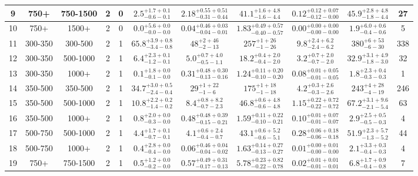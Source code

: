 \documentclass[11pt, oneside]{article}
\begin{document}
\begin{table}
{\begin{tabular}{ |c|c|c|c|c||c|c|c|c||c|c| }
9 & 750+ & 750-1500 & 2 & 0 & $2.5^{+1.7+0.1}_{-0.6-0.1}$ & $2.18^{+0.55+0.51}_{-0.31-0.44}$ & $41.1^{+1.6+4.8}_{-1.6-4.4}$ & $0.12^{+0.12+0.07}_{-0.12-0.00}$ & $45.9^{+2.8+4.8}_{-1.8-4.4}$ & 27 \\ \hline
10 & 750+ & 1500+ & 2 & 0 & $0.0^{+5.6+0.0}_{-0.0-0.0}$ & $0.04^{+0.46+0.03}_{-0.04-0.01}$ & $1.83^{+0.49+0.57}_{-0.40-0.57}$ & $0.00^{+0.00+0.00}_{-0.00-0.00}$ & $1.9^{+6.0+0.6}_{-0.4-0.6}$ & 5 \\ \hline
11 & 300-350 & 300-500 & 2 & 1 & $65.8^{+3.9+0.8}_{-3.4-0.8}$ & $48^{+ 2+46}_{- 2-13}$ & $257^{+ 1+26}_{- 1-26}$ & $9.8^{+2.4+6.2}_{-2.4-6.2}$ & $380^{+ 6+53}_{- 6-30}$ & 338 \\ \hline
12 & 300-350 & 500-1000 & 2 & 1 & $6.4^{+2.3+0.1}_{-1.2-0.1}$ & $5.0^{+0.7+4.0}_{-0.5-1.1}$ & $18.2^{+0.4+2.0}_{-0.4-2.0}$ & $3.2^{+0.7+2.0}_{-0.7-2.0}$ & $32.9^{+3.1+4.9}_{-1.8-3.0}$ & 32 \\ \hline
13 & 300-350 & 1000+ & 2 & 1 & $0.1^{+1.8+0.0}_{-0.1-0.0}$ & $0.31^{+0.48+0.30}_{-0.13-0.16}$ & $1.24^{+0.11+0.20}_{-0.10-0.20}$ & $0.08^{+0.01+0.05}_{-0.01-0.05}$ & $1.8^{+2.3+0.4}_{-0.3-0.3}$ & 1 \\ \hline
14 & 350-500 & 350-500 & 2 & 1 & $34.7^{+3.0+0.5}_{-2.4-0.4}$ & $29^{+ 1+22}_{- 1- 6}$ & $175^{+ 1+18}_{- 1-18}$ & $4.2^{+0.3+2.6}_{-0.3-2.6}$ & $243^{+ 4+28}_{- 4-19}$ & 246 \\ \hline
15 & 350-500 & 500-1000 & 2 & 1 & $10.8^{+2.2+0.2}_{-1.4-0.2}$ & $8.4^{+0.8+8.2}_{-0.7-2.3}$ & $46.8^{+0.6+4.8}_{-0.6-4.8}$ & $1.15^{+0.22+0.72}_{-0.22-0.72}$ & $67.2^{+3.1+9.6}_{-2.1-5.4}$ & 63 \\ \hline
16 & 350-500 & 1000+ & 2 & 1 & $0.8^{+2.0+0.0}_{-0.3-0.0}$ & $0.48^{+0.48+0.39}_{-0.15-0.21}$ & $1.59^{+0.11+0.22}_{-0.10-0.21}$ & $0.10^{+0.01+0.07}_{-0.01-0.07}$ & $2.9^{+2.5+0.5}_{-0.5-0.3}$ & 4 \\ \hline
17 & 500-750 & 500-1000 & 2 & 1 & $4.4^{+1.7+0.1}_{-0.7-0.1}$ & $4.1^{+0.6+2.4}_{-0.4-0.7}$ & $43.1^{+0.6+5.2}_{-0.6-5.1}$ & $0.28^{+0.06+0.18}_{-0.06-0.18}$ & $51.9^{+2.3+5.7}_{-1.3-5.2}$ & 44 \\ \hline
18 & 500-750 & 1000+ & 2 & 1 & $0.4^{+2.8+0.0}_{-0.4-0.0}$ & $0.06^{+0.46+0.04}_{-0.04-0.02}$ & $1.63^{+0.14+0.27}_{-0.13-0.27}$ & $0.01^{+0.00+0.01}_{-0.00-0.00}$ & $2.1^{+3.3+0.3}_{-0.4-0.3}$ & 4 \\ \hline
19 & 750+ & 750-1500 & 2 & 1 & $0.5^{+1.2+0.0}_{-0.2-0.0}$ & $0.57^{+0.49+0.31}_{-0.17-0.13}$ & $5.78^{+0.23+0.82}_{-0.22-0.78}$ & $0.02^{+0.01+0.01}_{-0.01-0.01}$ & $6.8^{+1.7+0.9}_{-0.4-0.8}$ & 7 \\ \hline

\end{tabular}}
\end{table}
\end{document}
